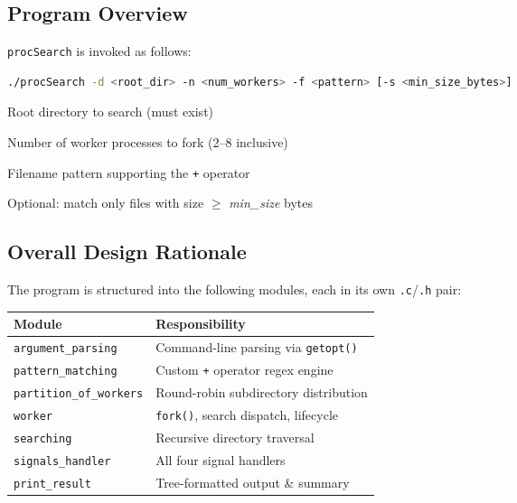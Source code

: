 \documentclass[12pt,a4paper]{article}
\begin{document}
\subsection{Program Overview}

\texttt{procSearch} is invoked as follows:

\begin{lstlisting}[language=bash, style=cstyle, caption={Program usage}]
./procSearch -d <root_dir> -n <num_workers> -f <pattern> [-s <min_size_bytes>]
\end{lstlisting}

\begin{description}[leftmargin=2cm]
    \item[\texttt{-d}] Root directory to search (must exist)
    \item[\texttt{-n}] Number of worker processes to fork (2--8 inclusive)
    \item[\texttt{-f}] Filename pattern supporting the \texttt{+} operator
    \item[\texttt{-s}] Optional: match only files with size $\geq$ \textit{min\_size} bytes
\end{description}

\subsection{Overall Design Rationale}

The program is structured into the following modules, each in its own
\texttt{.c}/\texttt{.h} pair:

\begin{center}
\begin{tabular}{ll}
    \toprule
    \textbf{Module} & \textbf{Responsibility} \\
    \midrule
    \texttt{argument\_parsing}    & Command-line parsing via \texttt{getopt()} \\
    \texttt{pattern\_matching}    & Custom \texttt{+} operator regex engine \\
    \texttt{partition\_of\_workers} & Round-robin subdirectory distribution \\
    \texttt{worker}               & \texttt{fork()}, search dispatch, lifecycle \\
    \texttt{searching}            & Recursive directory traversal \\
    \texttt{signals\_handler}     & All four signal handlers \\
    \texttt{print\_result}        & Tree-formatted output \& summary \\
    \bottomrule
\end{tabular}
\end{center}
\end{document}
